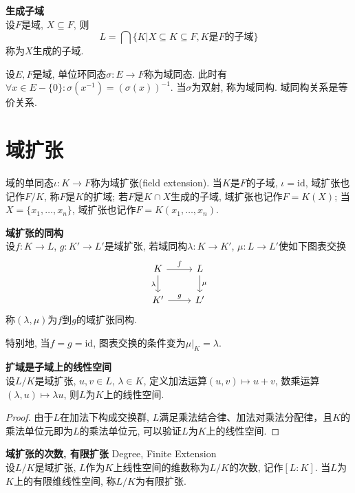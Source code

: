 \begin{pro} \textbf{生成子域}\\
设$F$是域, $X \subseteq F$, 则
\begin{displaymath}
    L=\bigcap \{K\vert X\subseteq K \subseteq F, K\text{是}F\text{的子域}\}
\end{displaymath}
称为$X$生成的子域. 
\end{pro}

\par 设$E, F$是域, 单位环同态$\sigma: E\to F$称为域同态. 此时有$\forall x\in E-\{0\}: \sigma(x^{-1}) = (\sigma(x))^{-1}$. 当$\sigma$为双射, 称为域同构. 域同构关系是等价关系. 

\section{域扩张}

\par 域的单同态$\iota:K\to F$称为域扩张(field extension). 当$K$是$F$的子域, $\iota=\mathrm{id}$, 域扩张也记作$F/K$, 称$F$是$K$的扩域; 若$F$是$K\cap X$生成的子域, 域扩张也记作$F=K(X)$; 当$X=\{x_1,\dots,x_n\}$, 域扩张也记作$F=K(x_1,\dots,x_n)$. 

\begin{dfn} \textbf{域扩张的同构}\\
设$f: K\to L$, $g: K'\to L'$是域扩张, 若域同构$\lambda: K\to K'$, $\mu: L \to L'$使如下图表交换
\[
  \begin{tikzcd}
    K \arrow{r}{f} \arrow[swap]{d}{\lambda} & L \arrow{d}{\mu} \\
    K' \arrow{r}{g} & L'
  \end{tikzcd}
\]
称$(\lambda, \mu)$为$f$到$g$的域扩张同构. 
\end{dfn}
特别地, 当$f=g=\mathrm{id}$, 图表交换的条件变为$\mu|_K = \lambda$. 

\begin{pro}\textbf{扩域是子域上的线性空间}\\
设$L/K$是域扩张, $u,v\in L$, $\lambda\in K$, 定义加法运算$(u,v)\mapsto u+v$, 数乘运算$(\lambda, u)\mapsto \lambda u$, 则$L$为$K$上的线性空间. 
\end{pro}
\begin{proof}
由于$L$在加法下构成交换群, $L$满足乘法结合律、加法对乘法分配律，且$K$的乘法单位元即为$L$的乘法单位元, 可以验证$L$为$K$上的线性空间. 
\end{proof}

\begin{dfn}\textbf{域扩张的次数, 有限扩张} Degree, Finite Extension\\
设$L/K$是域扩张, $L$作为$K$上线性空间的维数称为$L/K$的次数, 记作$[L:K]$. 当$L$为$K$上的有限维线性空间, 称$L/K$为有限扩张. 
\end{dfn}

